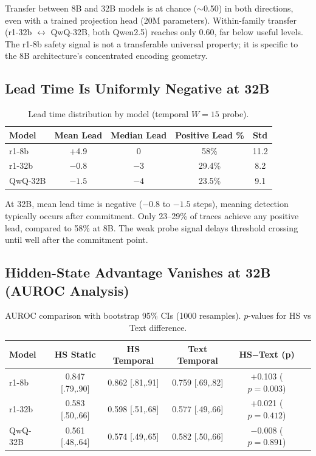 \documentclass[11pt]{article}
\begin{document}
Transfer between 8B and 32B models is at chance ($\sim$0.50) in both directions, even with a trained projection head (20M parameters). Within-family transfer (r1-32b $\leftrightarrow$ QwQ-32B, both Qwen2.5) reaches only 0.60, far below useful levels. The r1-8b safety signal is not a transferable universal property; it is specific to the 8B architecture's concentrated encoding geometry.

\subsection{Lead Time Is Uniformly Negative at 32B}

\begin{table}[h]
\centering
\caption{Lead time distribution by model (temporal $W{=}15$ probe).}
\label{tab:lead}
\small
\begin{tabular}{lcccc}
\toprule
Model & Mean Lead & Median Lead & Positive Lead \% & Std \\
\midrule
r1-8b & +4.9 & 0 & 58\% & 11.2 \\
r1-32b & $-0.8$ & $-3$ & 29.4\% & 8.2 \\
QwQ-32B & $-1.5$ & $-4$ & 23.5\% & 9.1 \\
\bottomrule
\end{tabular}
\end{table}

At 32B, mean lead time is negative ($-0.8$ to $-1.5$ steps), meaning detection typically occurs after commitment. Only 23--29\% of traces achieve any positive lead, compared to 58\% at 8B. The weak probe signal delays threshold crossing until well after the commitment point.

\subsection{Hidden-State Advantage Vanishes at 32B (AUROC Analysis)}

\begin{table}[h]
\centering
\caption{AUROC comparison with bootstrap 95\% CIs (1000 resamples). $p$-values for HS vs Text difference.}
\label{tab:auroc}
\small
\begin{tabular}{lccccc}
\toprule
Model & HS Static & HS Temporal & Text Temporal & HS$-$Text (p) \\
\midrule
r1-8b & 0.847 [.79,.90] & 0.862 [.81,.91] & 0.759 [.69,.82] & +0.103 ($p{=}0.003$) \\
r1-32b & 0.583 [.50,.66] & 0.598 [.51,.68] & 0.577 [.49,.66] & +0.021 ($p{=}0.412$) \\
QwQ-32B & 0.561 [.48,.64] & 0.574 [.49,.65] & 0.582 [.50,.66] & $-$0.008 ($p{=}0.891$) \\
\bottomrule
\end{tabular}
\end{table}
\end{document}
